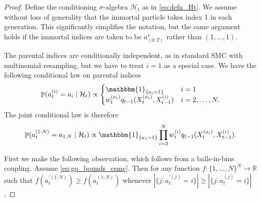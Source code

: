 \documentclass{article}
\theoremstyle{definition}
\DeclareMathOperator{\Prob}{\mathbb{P}}
\newcommand{\1}[1]{\mathbbm{1}_{\{#1\}}}
\begin{document}
\begin{proof}
Define the conditioning $\sigma$-algebra $\mathcal{H}_t$ as in \eqref{eq:defn_Ht}.
We assume without loss of generality that the immortal particle takes index 1 in each generation. This significantly simplifies the notation, but the same argument holds if the immortal indices are taken to be $a_{(0:T)}^\star$ rather than $(1,\dots,1)$.

The parental indices are conditionally independent, as in standard SMC with multinomial resampling, but we have to treat $i=1$ as a special case. We have the following conditional law on parental indices
\begin{equation*}
\Prob (a_t^{(i)} = a_i \mid \mathcal{H}_t) \propto
\begin{cases}
\1{a_i=1} &i=1 \\
w_t^{(a_i)} q_{t-1}(X_t^{(a_i)}, X_{t-1}^{(i)}) &i=2,\dots,N .
\end{cases}
\end{equation*}
The joint conditional law is therefore
\begin{equation*}
\Prob (a_t^{(1:N)} = a_{1:N} \mid \mathcal{H}_t) \propto \1{a_1 = 1} \prod_{i=2}^N w_t^{(i)} q_{t-1}(X_t^{(a_i)}, X_{t-1}^{(i)}).
\end{equation*}

First we make the following observation, which follows from a balls-in-bins coupling.
Assume \eqref{eq:gq_bounds_csmc}. 
Then for any function $f:\{1,\dots,N\}^N \to \mathbb{R}$ such that $f(a_t^{\prime(1:N)}) \geq f(a_t^{(1:N)})$ whenever $|\{j:a_t^{\prime(j)}=i\}| \geq |\{j:a_t^{(j)}=i\}|$,


\end{proof}
\end{document}

